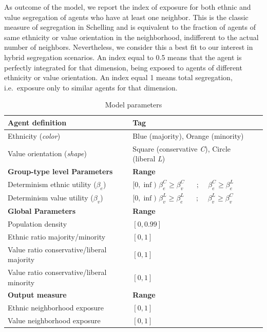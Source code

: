 \documentclass[
]{article}
\begin{document}
As outcome of the model, we report the index of exposure for both ethnic
and value segregation of agents who have at least one neighbor. This is
the classic measure of segregation in Schelling and is equivalent to the
fraction of agents of same ethnicity or value orientation in the
neighborhood, indifferent to the actual number of neighbors.
Nevertheless, we consider this a best fit to our interest in hybrid
segregation scenarios. An index equal to 0.5 means that the agent is
perfectly integrated for that dimension, being exposed to agents of
different ethnicity or value orientation. An index equal 1 means total
segregation, i.e.~exposure only to similar agents for that dimension.

\begin{table}[H]

\begin{tabular}{lll}
 \hline
\textbf{Agent definition}  & \textbf{Tag}    \\ 
 \hline
 Ethnicity  (\textit{color})         & Blue (majority), Orange (minority)  \\
 Value orientation (\textit{shape}) & Square (conservative \textit{C}), Circle (liberal \textit{L}) \\
  \hline
  \textbf{Group-type level Parameters}  & \textbf{Range}    \\ 
  \hline
 Determinism ethnic utility ($\beta_e$) & $[0,\inf)$ 
 $\beta^{C}_e \geq \beta^{C}_v$
 $\quad\text{   ;    }\quad \beta^{C}_e \geq \beta^{L}_e$
 \\
 Determinism value utility ($\beta_v$) & $[0,\inf)$ $\beta^{L}_v \geq \beta^{L}_e$
 $\quad\text{   ;    }\quad \beta^{L}_v \geq \beta^{C}_v$\\
 \hline
\textbf{Global Parameters}  & \textbf{Range} \\ 
\hline 
 Population density      & $[0,0.99]$ \\
 Ethnic ratio majority/minority &  $[0,1]$ \\
 Value ratio conservative/liberal majority & $[0,1]$ \\
 Value ratio conservative/liberal minority  & $[0,1]$ \\
 \hline
 \textbf{Output measure}  & \textbf{Range} \\ 
\hline 
 Ethnic neighborhood exposure      & $[0,1]$ \\
 Value neighborhood exposure       & $[0,1]$ \\
 \hline
\end{tabular}
 \caption{Model parameters} 
 \label{tab:parameters}
\end{table}
\end{document}
